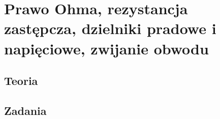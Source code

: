 \chapter{Prawo Ohma, rezystancja zastępcza, dzielniki pradowe i napięciowe, zwijanie obwodu}

\section{Teoria}





\section{Zadania}
























